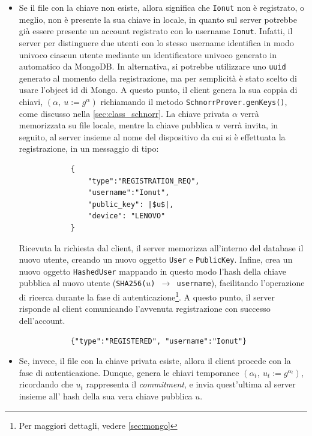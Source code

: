 \begin{itemize}
	\item Se il file con la chiave non esiste, allora significa che \texttt{Ionut} non è registrato, o meglio, non è presente la sua chiave in locale, in quanto sul server potrebbe già essere presente un account registrato con lo username \texttt{Ionut}. Infatti, il server per distinguere due utenti con lo stesso username identifica in modo univoco ciascun utente mediante un identificatore univoco generato in automatico da MongoDB. In alternativa, si potrebbe utilizzare uno \texttt{uuid} generato al momento della registrazione, ma per semplicità è stato scelto di usare l'object id di Mongo. A questo punto, il client genera la sua coppia di chiavi, $(\alpha,\ u := g^\alpha)$ richiamando il metodo \texttt{SchnorrProver.genKeys()}, come discusso nella \autoref{sec:class_schnorr}. La chiave privata $\alpha$ verrà memorizzata su file locale, mentre la chiave pubblica $u$ verrà invita, in seguito, al server insieme al nome del dispositivo da cui si è effettuata la registrazione, in un messaggio di tipo:
	      \begin{center}
	      	\begin{verbatim}
            {
                "type":"REGISTRATION_REQ",
                "username":"Ionut",
                "public_key": |$u$|,
                "device": "LENOVO"
            }
	      	\end{verbatim}
	      \end{center}
	      Ricevuta la richiesta dal client, il server memorizza all'interno del database il nuovo utente, creando un nuovo oggetto \texttt{User} e \texttt{PublicKey}. Infine, crea un nuovo oggetto \texttt{HashedUser} mappando in questo modo l'hash della chiave pubblica al nuovo utente (\texttt{SHA256($u$) $\rightarrow$  username}), facilitando l'operazione di ricerca durante la fase di autenticazione\footnote{Per maggiori dettagli, vedere \autoref{sec:mongo}}. A questo punto, il server risponde al client comunicando l'avvenuta registrazione con successo dell'account.
          \begin{center}
	      	\begin{verbatim}
            {"type":"REGISTERED", "username":"Ionut"}
	      	\end{verbatim}
	      \end{center}
	\item {Se, invece, il file con la chiave privata esiste, allora il client procede con la fase di autenticazione. Dunque, genera le chiavi temporanee $(\alpha_t,\ u_t := g^{\alpha_t})$, ricordando che $u_t$ rappresenta il \textit{commitment}, e invia quest'ultima al server insieme all' hash della sua vera chiave pubblica $u$.
}
\end{itemize}

